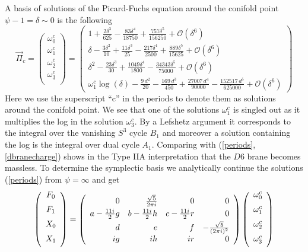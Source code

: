 \documentclass[12pt]{article}
\begin{document}
A basis of solutions of the Picard-Fuchs equation around the
conifold point $\psi-1=\delta\sim 0$ is the following
\begin{equation}
\vec \Pi_c=\left(
\begin{array}{c}
\omega_0^c\\
\omega_1^c\\
\omega_2^c\\
\omega_3^c\\
\end{array}
\right)
=\left(
\begin{array}{l}
1+\frac{2\delta^3}{625}-\frac{83\delta^4}{18750}+\frac{757\delta^5}{156250}+\mathcal{O}(\delta^6)\\
\delta-\frac{3\delta^2}{10}+\frac{11\delta^3}{25}-\frac{217\delta^4}{2500}+\frac{889\delta^5}{15625}+\mathcal{O}(\delta^6)\\
\delta^2-\frac{23\delta^3}{30}+\frac{1049\delta^4}{1800}-\frac{34343\delta^5}{75000}+\mathcal{O}(\delta^6) \\
\omega_1^c\log(\delta)-\frac{9\,d^2}{20} - \frac{169\,d^3}{450} + 
  \frac{27007\,d^4}{90000} - 
  \frac{152517\,d^5}{625000}+\mathcal{O}(\delta^6)
\end{array}
\right)
\end{equation}
Here we use the superscript ``c'' in the periods to denote them as
solutions around the conifold point. We see that one of the
solutions $\omega_1^c$ is singled out as it multiplies the log in
the solution $\omega_3^c$. By a Lefshetz argument \cite{AGV} it
corresponds to the integral over the vanishing $S^3$ cycle $B_1$
and moreover a solution containing the log is the integral over
dual cycle $A_1$. Comparing with
(\ref{periods},\ref{dbranecharge}) shows in the Type IIA
interpretation that the $D6$ brane becomes massless. To determine
the symplectic basis we analytically continue the solutions
(\ref{periods}) from $\psi=\infty$ and get
\begin{equation}
\left(
\begin{array}{c}
F_0\\[2 mm]
F_1\\[2 mm]
X_0\\[2 mm]
X_1\\[2 mm]
\end{array}
\right)=
\left(\begin{array}{rrrr}
0&{\sqrt{5}\over 2 \pi i}&0&0\\[1 mm]
a-{11 i\over 2} g& b-{11i \over 2}h& c-{11i \over 2}r&0\\[1 mm]
d&e&f&-{ \sqrt{5} \over (2 \pi i)^2}\\
ig&ih& ir& 0\end{array}
\right)\left(
\begin{array}{c}
\omega_0^c\\[2 mm]
\omega_1^c\\[2 mm]
\omega_2^c\\[2 mm]
\omega_3^c\\[2 mm]
\end{array}
\right)
\end{equation}
\end{document}
